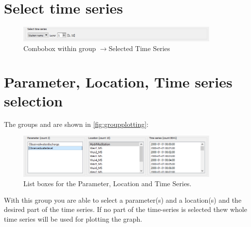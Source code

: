 \documentclass{deltares_memo}
\newcommand{\menuarrow}{$\rightarrow$}
\begin{document}
\section{Select time series}
\begin{figure}[H]
\centering    
\includegraphics[width=0.9\textwidth]{pictures/group_select_time_series.png}
\caption{Combobox within group \menuarrow{Selected Time Series}}
\end{figure}
\section{Parameter, Location, Time series selection}
The groups   and  are shown in \autoref{fig:groupplotting}:
\begin{figure}[H]
    \centering    
    \includegraphics[width=0.9\textwidth]{pictures/group_parameter_location_time.png}
    \caption{List boxes for the Parameter, Location and Time Series.}
\end{figure}
With this group you are able to select a parameter(s) and a location(s) and the desired part of the time series. 
If no part of the time-series is selected thew whole time series will be used for plotting the graph.
\end{document}
